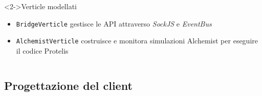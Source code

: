 \begin{frame}{\insertsectionhead}
      \begin{columns}
        \begin{column}{.99\textwidth}
          \begin{block}<2->{Verticle modellati}
            \begin{itemize}
              \item \texttt{BridgeVerticle} gestisce le API attraverso \emph{SockJS} e \emph{EventBus}
              \item \texttt{AlchemistVerticle} costruisce e monitora simulazioni Alchemist per eseguire il codice Protelis
            \end{itemize}
          \end{block}
        \end{column}
      \end{columns}
    \end{frame}

  \subsection{Progettazione del client}

